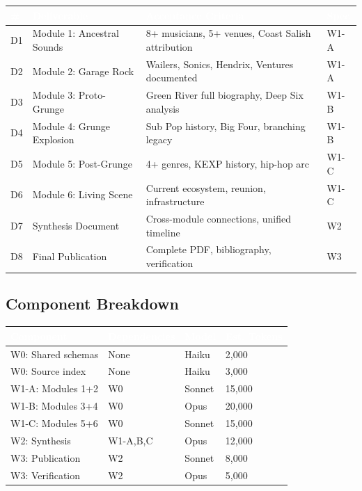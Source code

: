\documentclass[11pt,letterpaper]{article}
\newcommand{\tableheader}[1]{\textbf{\sffamily\textcolor{white}{#1}}}
\begin{document}
\begin{center}
\begin{tabularx}{\textwidth}{C{0.8cm}L{3.5cm}XC{2cm}}
\toprule
{}
\tableheader{\#} & \tableheader{Deliverable} & \tableheader{Acceptance Criteria} & \tableheader{Spec} \\
\midrule
D1 & Module 1: Ancestral Sounds & 8+ musicians, 5+ venues, Coast Salish attribution & W1-A \\
D2 & Module 2: Garage Rock & Wailers, Sonics, Hendrix, Ventures documented & W1-A \\
D3 & Module 3: Proto-Grunge & Green River full biography, Deep Six analysis & W1-B \\
D4 & Module 4: Grunge Explosion & Sub Pop history, Big Four, branching legacy & W1-B \\
D5 & Module 5: Post-Grunge & 4+ genres, KEXP history, hip-hop arc & W1-C \\
D6 & Module 6: Living Scene & Current ecosystem, reunion, infrastructure & W1-C \\
D7 & Synthesis Document & Cross-module connections, unified timeline & W2 \\
D8 & Final Publication & Complete PDF, bibliography, verification & W3 \\
\bottomrule
\end{tabularx}
\end{center}

\subsection{Component Breakdown}

\begin{center}
\begin{tabularx}{\textwidth}{L{3cm}L{2.5cm}C{1.5cm}C{2cm}}
\toprule
{}
\tableheader{Component} & \tableheader{Dependencies} & \tableheader{Model} & \tableheader{Est. Tokens} \\
\midrule
W0: Shared schemas & None & Haiku & 2,000 \\
W0: Source index & None & Haiku & 3,000 \\
W1-A: Modules 1+2 & W0 & Sonnet & 15,000 \\
W1-B: Modules 3+4 & W0 & Opus & 20,000 \\
W1-C: Modules 5+6 & W0 & Sonnet & 15,000 \\
W2: Synthesis & W1-A,B,C & Opus & 12,000 \\
W3: Publication & W2 & Sonnet & 8,000 \\
W3: Verification & W2 & Opus & 5,000 \\
\bottomrule
\end{tabularx}
\end{center}
\end{document}
